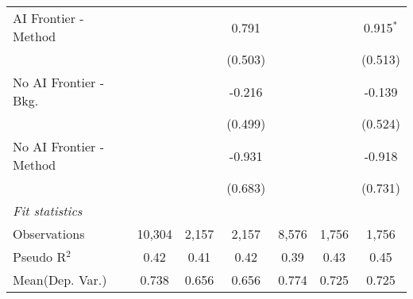 \begin{tabular}{lcccccc}
   AI Frontier - Method    &              &              & 0.791         &               &         & 0.915$^{*}$\\   
                           &              &              & (0.503)       &               &         & (0.513)\\   
   No AI Frontier - Bkg.   &              &              & -0.216        &               &         & -0.139\\   
                           &              &              & (0.499)       &               &         & (0.524)\\   
   No AI Frontier - Method &              &              & -0.931        &               &         & -0.918\\   
                           &              &              & (0.683)       &               &         & (0.731)\\   
   \midrule
   \emph{Fit statistics}\\
   Observations            & 10,304       & 2,157        & 2,157         & 8,576         & 1,756   & 1,756\\  
   Pseudo R$^2$            & 0.42         & 0.41         & 0.42          & 0.39          & 0.43    & 0.45\\  
Mean(Dep. Var.) & 0.738 & 0.656 & 0.656 & 0.774 & 0.725 & 0.725 \\
   

\end{tabular}
